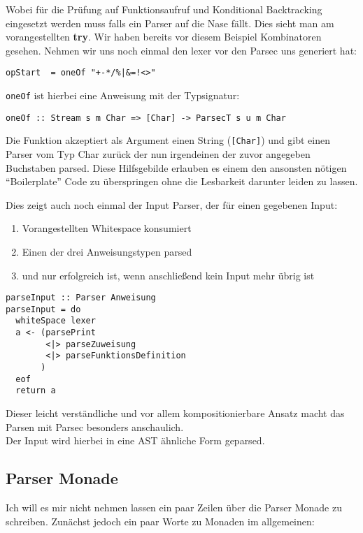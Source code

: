\documentclass[12pt,german]{article}
\begin{document}
\noindent Wobei für die Prüfung auf Funktionsaufruf und Konditional Backtracking
eingesetzt werden muss falls ein Parser auf die Nase fällt. Dies sieht
man am vorangestellten \textbf{try}. Wir haben bereits vor diesem
Beispiel Kombinatoren gesehen. Nehmen wir uns noch einmal den lexer
vor den Parsec uns generiert hat:
\begin{lstlisting}
opStart  = oneOf "+-*/%|&=!<>"
\end{lstlisting}
\texttt{oneOf} ist hierbei eine Anweisung mit der Typsignatur:
\begin{lstlisting}
oneOf :: Stream s m Char => [Char] -> ParsecT s u m Char
\end{lstlisting}
Die Funktion akzeptiert als Argument einen String (\texttt{[Char]}) und
gibt einen Parser vom Typ Char zurück der nun irgendeinen der zuvor
angegeben Buchstaben parsed. Diese Hilfsgebilde erlauben es einem den
ansonsten nötigen ``Boilerplate'' Code zu überspringen ohne die
Lesbarkeit darunter leiden zu lassen.\cite{ParsecChar14}

Dies zeigt auch noch einmal der Input Parser, der für einen gegebenen Input:
\begin{enumerate}
\item Vorangestellten Whitespace konsumiert
\item Einen der drei Anweisungstypen parsed
\item und nur erfolgreich ist, wenn anschließend kein Input mehr übrig ist
\end{enumerate}

\begin{lstlisting}[caption=Inputparser]
parseInput :: Parser Anweisung
parseInput = do
  whiteSpace lexer
  a <- (parsePrint
        <|> parseZuweisung
        <|> parseFunktionsDefinition
       )
  eof
  return a
\end{lstlisting}

\noindent Dieser leicht verständliche und vor allem kompositionierbare Ansatz
macht das Parsen mit Parsec besonders anschaulich.\\
Der Input wird hierbei in eine AST ähnliche Form geparsed.

\subsection*{Parser Monade}

Ich will es mir nicht nehmen lassen ein paar Zeilen über die Parser
Monade zu schreiben. Zunächst jedoch ein paar Worte zu Monaden im
allgemeinen:
\end{document}
